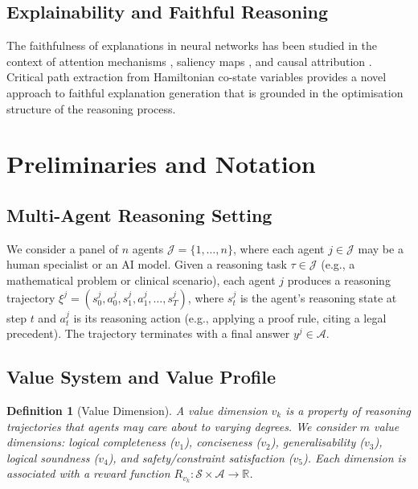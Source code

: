 \documentclass[12pt,a4paper]{article}
\newtheorem{definition}{Definition}[section]
\newcommand{\R}{\mathbb{R}}
\newcommand{\calS}{\mathcal{S}}
\newcommand{\calA}{\mathcal{A}}
\newcommand{\calJ}{\mathcal{J}}
\begin{document}
\subsection{Explainability and Faithful Reasoning}

The faithfulness of explanations in neural networks has been studied in the context of
attention mechanisms \citep{jain2019attention}, saliency maps \citep{samek2017evaluating},
and causal attribution \citep{pearl2009causality}. Critical path extraction from
Hamiltonian co-state variables provides a novel approach to faithful explanation
generation that is grounded in the optimisation structure of the reasoning process.

\section{Preliminaries and Notation}
\label{sec:prelim}

\subsection{Multi-Agent Reasoning Setting}

We consider a panel of $n$ agents $\calJ = \{1, \ldots, n\}$, where each agent $j
\in \calJ$ may be a human specialist or an AI model. Given a reasoning task $\tau \in
\mathscr{J} $ (e.g., a mathematical problem or clinical scenario), each agent
$j$ produces a reasoning trajectory $\xi^j = (s_0^j, a_0^j, s_1^j, a_1^j, \ldots,
s_T^j)$, where $s_t^j$ is the agent's reasoning state at step $t$ and $a_t^j$ is its
reasoning action (e.g., applying a proof rule, citing a legal precedent). The
trajectory terminates with a final answer $y^j \in \calA$.

\subsection{Value System and Value Profile}

\begin{definition}[Value Dimension]
  A \emph{value dimension} $v_k$ is a property of reasoning trajectories that agents
  may care about to varying degrees. We consider $m$ value dimensions: logical
  completeness ($v_1$), conciseness ($v_2$), generalisability ($v_3$), logical
  soundness ($v_4$), and safety/constraint satisfaction ($v_5$). Each dimension is
  associated with a reward function $R_{v_k}: \calS \times \calA \rightarrow \R$.
\end{definition}
\end{document}
